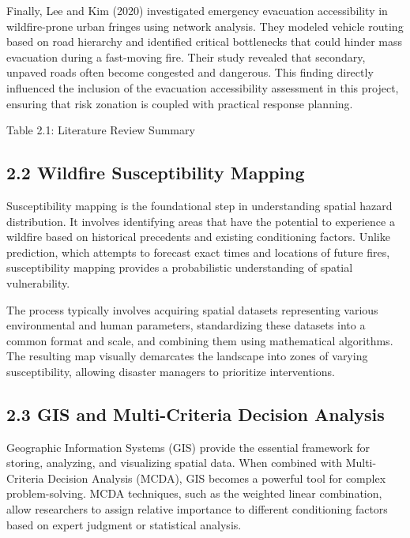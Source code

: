\documentclass[12pt,a4paper]{article}
\begin{document}
Finally, Lee and Kim (2020) investigated emergency evacuation accessibility in wildfire-prone urban fringes using network analysis. They modeled vehicle routing based on road hierarchy and identified critical bottlenecks that could hinder mass evacuation during a fast-moving fire. Their study revealed that secondary, unpaved roads often become congested and dangerous. This finding directly influenced the inclusion of the evacuation accessibility assessment in this project, ensuring that risk zonation is coupled with practical response planning.


Table 2.1: Literature Review Summary



\subsection*{2.2 Wildfire Susceptibility Mapping}

Susceptibility mapping is the foundational step in understanding spatial hazard distribution. It involves identifying areas that have the potential to experience a wildfire based on historical precedents and existing conditioning factors. Unlike prediction, which attempts to forecast exact times and locations of future fires, susceptibility mapping provides a probabilistic understanding of spatial vulnerability.


The process typically involves acquiring spatial datasets representing various environmental and human parameters, standardizing these datasets into a common format and scale, and combining them using mathematical algorithms. The resulting map visually demarcates the landscape into zones of varying susceptibility, allowing disaster managers to prioritize interventions.



\subsection*{2.3 GIS and Multi-Criteria Decision Analysis}

Geographic Information Systems (GIS) provide the essential framework for storing, analyzing, and visualizing spatial data. When combined with Multi-Criteria Decision Analysis (MCDA), GIS becomes a powerful tool for complex problem-solving. MCDA techniques, such as the weighted linear combination, allow researchers to assign relative importance to different conditioning factors based on expert judgment or statistical analysis.
\end{document}

